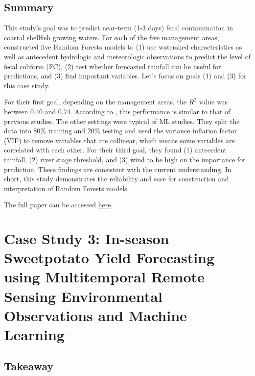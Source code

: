 \documentclass[
]{book}
\begin{document}
\hypertarget{summary-1}{%
\subsection{Summary}\label{summary-1}}

This study's goal was to predict near-term (1-3 days) fecal contamination in coastal shellfish growing waters. For each of the five management areas, \citet{chazal2024} constructed five Random Forests models to (1) use watershed characteristics as well as antecedent hydrologic and meteorologic observations to predict the level of fecal coliform (FC), (2) test whether forecasted rainfall can be useful for predictions, and (3) find important variables. Let's focus on goals (1) and (3) for this case study.

For their first goal, depending on the management areas, the \(R^2\) value was between 0.40 and 0.74. According to \citet{chazal2024}, this performance is similar to that of previous studies. The other settings were typical of ML studies. They split the data into 80\% training and 20\% testing and used the variance inflation factor (VIF) to remove variables that are collinear, which means some variables are correlated with each other. For their third goal, they found (1) antecedent rainfall, (2) river stage threshold, and (3) wind to be high on the importance for prediction. These findings are consistent with the current understanding. In short, this study demonstrates the reliability and ease for construction and interpretation of Random Forests models.

The full paper can be accessed \href{https://www.sciencedirect.com/science/article/pii/S0025326X24000304?via\%3Dihub}{here}.

\hypertarget{case-study-3-in-season-sweetpotato-yield-forecasting-using-multitemporal-remote-sensing-environmental-observations-and-machine-learning}{%
\section{Case Study 3: In-season Sweetpotato Yield Forecasting using Multitemporal Remote Sensing Environmental Observations and Machine Learning}\label{case-study-3-in-season-sweetpotato-yield-forecasting-using-multitemporal-remote-sensing-environmental-observations-and-machine-learning}}

\hypertarget{takeaway-2}{%
\subsection{Takeaway}\label{takeaway-2}}
\end{document}
